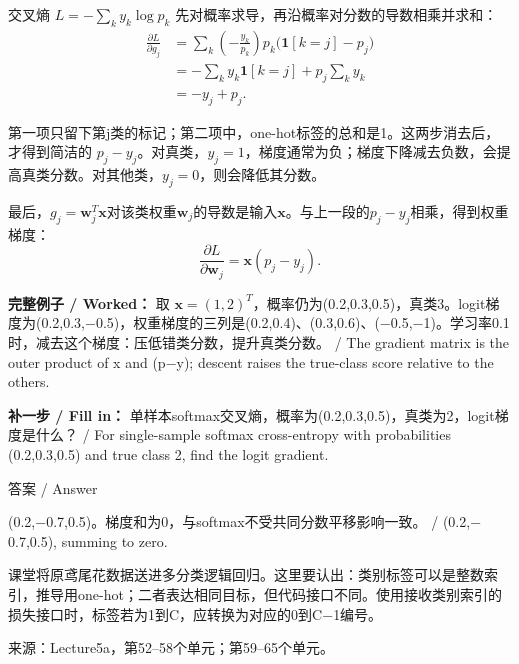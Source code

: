 交叉熵 \(L=-\sum_k y_k\log p_k\) 先对概率求导，再沿概率对分数的导数相乘并求和：
\[
\begin{aligned}
\frac{\partial L}{\partial g_j}
&=\sum_k\left(-\frac{y_k}{p_k}\right)p_k\big(\mathbf1[k=j]-p_j\big)\\
&=-\sum_k y_k\mathbf1[k=j]+p_j\sum_k y_k\\
&=-y_j+p_j.
\end{aligned}\tag{5.5}
\]


第一项只留下第j类的标记；第二项中，one-hot标签的总和是1。这两步消去后，才得到简洁的 \(p_j-y_j\)。对真类，\(y_j=1\)，梯度通常为负；梯度下降减去负数，会提高真类分数。对其他类，\(y_j=0\)，则会降低其分数。


最后，\(g_j=\mathbf w_j^T\mathbf x\)对该类权重\(\mathbf w_j\)的导数是输入\(\mathbf x\)。与上一段的\(p_j-y_j\)相乘，得到权重梯度：
\[
\frac{\partial L}{\partial\mathbf w_j}=\mathbf x(p_j-y_j).\tag{5.6}
\]


\textbf{完整例子 / Worked：} 取 \(\mathbf x=(1,2)^T\)，概率仍为(0.2,0.3,0.5)，真类3。logit梯度为(0.2,0.3,\ensuremath{-}0.5)，权重梯度的三列是(0.2,0.4)、(0.3,0.6)、(\ensuremath{-}0.5,\ensuremath{-}1)。学习率0.1时，减去这个梯度：压低错类分数，提升真类分数。 / The gradient matrix is the outer product of x and (p\ensuremath{-}y); descent raises the true-class score relative to the others.


\textbf{补一步 / Fill in：} 单样本softmax交叉熵，概率为(0.2,0.3,0.5)，真类为2，logit梯度是什么？ / For single-sample softmax cross-entropy with probabilities (0.2,0.3,0.5) and true class 2, find the logit gradient.



\begin{StudySolution}{答案 / Answer}


(0.2,\ensuremath{-}0.7,0.5)。梯度和为0，与softmax不受共同分数平移影响一致。 / (0.2,\ensuremath{-}0.7,0.5), summing to zero.


\end{StudySolution}


课堂将原鸢尾花数据送进多分类逻辑回归。这里要认出：类别标签可以是整数索引，推导用one-hot；二者表达相同目标，但代码接口不同。使用接收类别索引的损失接口时，标签若为1到C，应转换为对应的0到C\ensuremath{-}1编号。


来源：Lecture5a，第52–58个单元；第59–65个单元。









